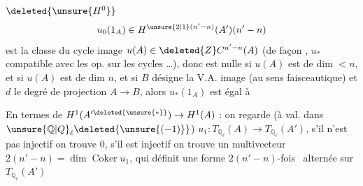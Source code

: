 $\deleted{\unsure{H^0}}$
\[
 u_0(1_A)\in H^{\unsure{2|1}(n'-n)}(A')(n'-n)
\]
est la classe du cycle image $u(A)\in\deleted{Z}C^{n'-n}(A)$ (de façon , $u_*$ compatible avec les op.  sur les cycles \ldots), donc
est nulle si $u(A)$ est de dim $<n$, et si $u(A)$ est de dim $n$, et si $B$ désigne la V.A.  image (au sens faisceautique) et $d$ le degré de projection $A\to B$,
alors $u_*(1_A)$ est égal à

En termes de $H^1(A'^{\deleted{\unsure{*}}})\to H^1(A)$ : on regarde  (à val. dans $\unsure{\mathbb Q|Q}_\ell\deleted{\unsure{(-1)}}$)
$u_1:T_{\mathbb Q_\ell}(A)\longrightarrow T_{\mathbb Q_\ell}(A')$,  s'il n'est pas
injectif on trouve $0$, s'il est injectif on trouve un multivecteur  $2(n'-n)=\dim\operatorname{Coker}u_1$, qui définit une forme $2(n'-n)$-fois \ alternée sur $T_{\mathbb Q_\ell}(A')$

